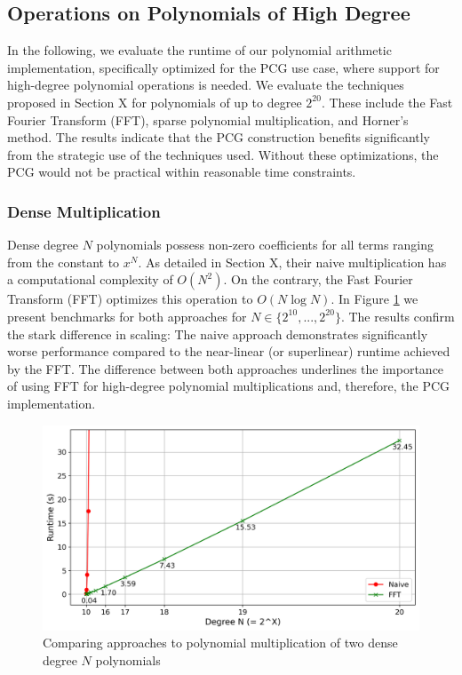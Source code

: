 \subsection{Operations on Polynomials of High Degree}
In the following, we evaluate the runtime of our polynomial arithmetic implementation, specifically optimized for the PCG use case, where support for high-degree polynomial operations is needed. We evaluate the techniques proposed in Section X for polynomials of up to degree $2^{20}$. These include the Fast Fourier Transform (FFT), sparse polynomial multiplication, and Horner's method. The results indicate that the PCG construction benefits significantly from the strategic use of the techniques used. Without these optimizations, the PCG would not be practical within reasonable time constraints.

\subsubsection{Dense Multiplication}
Dense degree $N$ polynomials possess non-zero coefficients for all terms ranging from the constant to $x^N$. As detailed in Section X, their naive multiplication has a computational complexity of $O(N^2)$. On the contrary, the Fast Fourier Transform (FFT) optimizes this operation to $O(N \log N)$. In Figure \ref{fig:polyMultNaiveVsFFT} we present benchmarks for both approaches for $N\in \{2^{10}, ..., 2^{20}\}$. The results confirm the stark difference in scaling: The naive approach demonstrates significantly worse performance compared to the near-linear (or superlinear) runtime achieved by the FFT. The difference between both approaches underlines the importance of using FFT for high-degree polynomial multiplications and, therefore, the PCG implementation.

\begin{figure}[t]
    \centering
    \includegraphics[scale=0.49]{images/plots/poly_mult.png}
    \caption{Comparing approaches to polynomial multiplication of two dense degree $N$ polynomials}
    \label{fig:polyMultNaiveVsFFT}
\end{figure}

